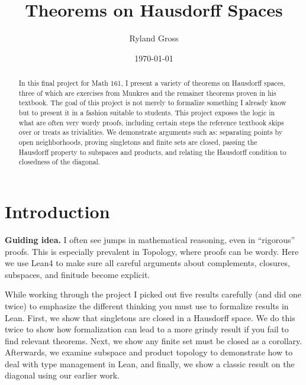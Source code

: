 \documentclass[11pt]{article}
\title{Theorems on Hausdorff Spaces}
\author{Ryland Gross}
\date{\today}
\begin{document}
\maketitle


\begin{abstract}
In this final project for Math 161, I present a variety of theorems on Hausdorff spaces, three of which are exercises from Munkres and the remainer theorems proven in his textbook. The goal of this project is not merely to formalize something I already know but to present it in a fashion suitable to students. This project exposes the logic in what are often very wordy proofs, including certain steps the reference textbook skips over or treats as trivialities. We demonstrate arguments such as: separating points by open neighborhoods, proving singletons and finite sets are closed, passing the Hausdorff property to subspaces and products, and relating the Hausdorff condition to closedness of the diagonal.
\end{abstract}

\tableofcontents


\large

\section{Introduction}

\begin{guidingbox}
\textbf{Guiding idea.} I often see jumps in mathematical reasoning, even in ``rigorous'' proofs. This is especially prevalent in Topology, where proofs can be wordy. Here we use Lean4 to make sure all careful arguments about complements, closures, subspaces, and finitude become explicit.
\end{guidingbox}

%
While working through the project I picked out five results carefully (and did one twice) to emphasize the different thinking you must use to formalize results in Lean. First, we show that singletons are closed in a Hausdorff space. We do this twice to show how formalization can lead to a more grindy result if you fail to find relevant theorems. Next, we show any finite set must be closed as a corollary. Afterwards, we examine subspace and product topology to demonstrate how to deal with type management in Lean, and finally, we show a classic result on the diagonal using our earlier work. 
\end{document}
